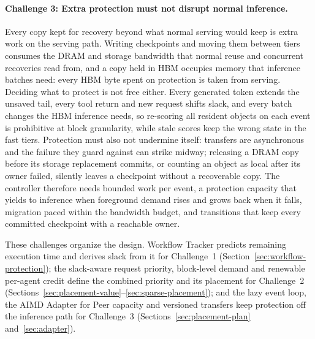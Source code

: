 \paragraph{Challenge 3: Extra protection must not disrupt normal inference.}
Every copy kept for recovery beyond what normal serving would keep is
extra work on the serving path. Writing checkpoints and moving them
between tiers consumes the DRAM and storage bandwidth that normal reuse
and concurrent recoveries read from, and a copy held in HBM occupies
memory that inference batches need: every HBM byte spent on protection
is taken from serving. Deciding what to protect is not free either.
Every generated token extends the unsaved tail, every tool return and
new request shifts slack, and every batch changes the HBM inference
needs, so re-scoring all resident objects on each event is prohibitive
at block granularity, while stale scores keep the wrong state in the
fast tiers. Protection must also not undermine itself: transfers are
asynchronous and the failure they guard against can strike midway;
releasing a DRAM copy before its storage replacement commits, or
counting an object as local after its owner failed, silently leaves a
checkpoint without a recoverable copy. The controller therefore needs
bounded work per event, a protection capacity that yields to inference
when foreground demand rises and grows back when it falls, migration
paced within the bandwidth budget, and transitions that keep every
committed checkpoint with a reachable owner.

\label{sec:motivation-goals}
These challenges organize the design. Workflow Tracker predicts remaining
execution time and derives slack from it for Challenge~1
(Section~\ref{sec:workflow-protection}); the slack-aware request
priority, block-level demand and renewable per-agent credit define the
combined priority and its placement for Challenge~2
(Sections~\ref{sec:placement-value}--\ref{sec:sparse-placement}); and
the lazy event loop, the AIMD Adapter for Peer capacity and versioned
transfers keep protection off the inference path for Challenge~3
(Sections~\ref{sec:placement-plan} and~\ref{sec:adapter}).
